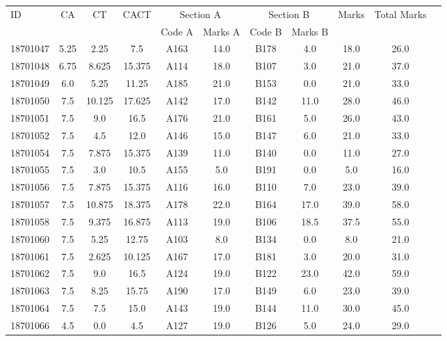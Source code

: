 \documentclass[12pt]{article}
\begin{document}
    \begin{center} 
	\renewcommand{\arraystretch}{1.08}
	\begin{small}
    \begin{tabular}{|l|c|c|c|c|c|c|c|c|c|c|} \hline
	\multirow{2}{*}{ID} & 	\multirow{2}{*}{CA}  & 	\multirow{2}{*}{CT}  & 	\multirow{2}{*}{CACT}  & \multicolumn{2 }{|c|}{Section A}& \multicolumn{2 }{c|}{Section B} & 	\multirow{2}{*}{Marks}  & 	\multirow{2}{*}{Total Marks}  \\ 
	&  &  &  & Code A & Marks A & Code B & Marks B&  &  \\ \hline
18701047 & 5.25 & 2.25 & 7.5 & A163 & 14.0 & B178 & 4.0 & 18.0 & 26.0\\ \hline 
18701048 & 6.75 & 8.625 & 15.375 & A114 & 18.0 & B107 & 3.0 & 21.0 & 37.0\\ \hline 
18701049 & 6.0 & 5.25 & 11.25 & A185 & 21.0 & B153 & 0.0 & 21.0 & 33.0\\ \hline 
18701050 & 7.5 & 10.125 & 17.625 & A142 & 17.0 & B142 & 11.0 & 28.0 & 46.0\\ \hline 
18701051 & 7.5 & 9.0 & 16.5 & A176 & 21.0 & B161 & 5.0 & 26.0 & 43.0\\ \hline 
18701052 & 7.5 & 4.5 & 12.0 & A146 & 15.0 & B147 & 6.0 & 21.0 & 33.0\\ \hline 
18701054 & 7.5 & 7.875 & 15.375 & A139 & 11.0 & B140 & 0.0 & 11.0 & 27.0\\ \hline 
18701055 & 7.5 & 3.0 & 10.5 & A155 & 5.0 & B191 & 0.0 & 5.0 & 16.0\\ \hline 
18701056 & 7.5 & 7.875 & 15.375 & A116 & 16.0 & B110 & 7.0 & 23.0 & 39.0\\ \hline 
18701057 & 7.5 & 10.875 & 18.375 & A178 & 22.0 & B164 & 17.0 & 39.0 & 58.0\\ \hline 
18701058 & 7.5 & 9.375 & 16.875 & A113 & 19.0 & B106 & 18.5 & 37.5 & 55.0\\ \hline 
18701060 & 7.5 & 5.25 & 12.75 & A103 & 8.0 & B134 & 0.0 & 8.0 & 21.0\\ \hline 
18701061 & 7.5 & 2.625 & 10.125 & A167 & 17.0 & B181 & 3.0 & 20.0 & 31.0\\ \hline 
18701062 & 7.5 & 9.0 & 16.5 & A124 & 19.0 & B122 & 23.0 & 42.0 & 59.0\\ \hline 
18701063 & 7.5 & 8.25 & 15.75 & A190 & 17.0 & B149 & 6.0 & 23.0 & 39.0\\ \hline 
18701064 & 7.5 & 7.5 & 15.0 & A143 & 19.0 & B144 & 11.0 & 30.0 & 45.0\\ \hline 
18701066 & 4.5 & 0.0 & 4.5 & A127 & 19.0 & B126 & 5.0 & 24.0 & 29.0\\ \hline 

\end{tabular}
\end{small}
\end{center}
\end{document}
